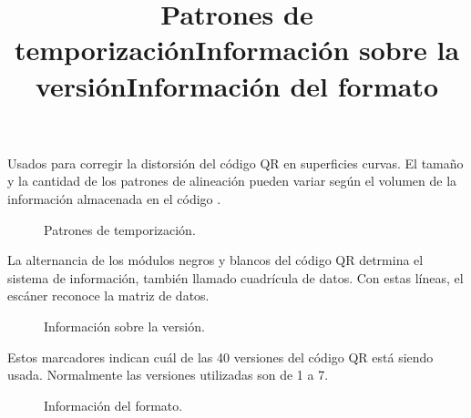 Usados para corregir la distorsión del código QR en superficies curvas. El tamaño y la cantidad de los patrones de alineación pueden variar según el volumen de la información almacenada en el código \cite{CitaA01}. \\

\title{Patrones de temporización}

\begin{figure}[htbp]
	\begin{center}
		\caption{Patrones de temporización.}
		\label{fig:temporizacion}
	\end{center}
\end{figure}

La alternancia de los módulos negros y blancos del código QR detrmina el sistema de información, también llamado cuadrícula de datos. Con estas líneas, el escáner reconoce la matriz de datos. 

\newpage

\title{Información sobre la versión}

\begin{figure}[htbp]
	\begin{center}
		\caption{Información sobre la versión.}
		\label{fig:version}
	\end{center}
\end{figure}

Estos marcadores indican cuál de las 40 versiones del código QR está siendo usada. Normalmente las versiones utilizadas son de 1 a 7. \cite{CitaA01}\\

\title{Información del formato}

\begin{figure}[htbp]
	\begin{center}
		\caption{Información del formato.}
		\label{fig:formato2}
	\end{center}
\end{figure}

